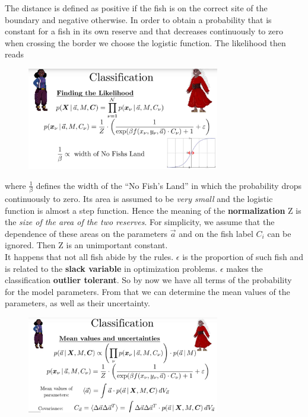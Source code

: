 \documentclass[12pt, a4paper]{scrartcl}
\begin{document}
The distance is defined as positive if the fish is on the correct site of the boundary and negative otherwise.
In order to obtain a probability that is constant for a fish in its own reserve and that decreases continuously to zero when crossing the border we choose the logistic function.
The likelihood then reads%
\begin{figure}[H]
	\centering
	\includegraphics[width=0.75\textwidth]{7_14.png}
\end{figure}
where $\frac {1}{\beta}$ defines the width of the ``No Fish’s Land'' in which the probability
drops continuously to zero. 
Its area is assumed to be \textit{very small} and the logistic function is almost a step function. 
Hence the meaning of the \textbf{normalization} Z is the \textit{size of the area of the two reserves}. For simplicity, we assume that the dependence of these areas on the parameters $\vec{a}$ and on the fish label $C_i$ can be ignored.
Then Z is an unimportant constant.\\
It happens that not all fish abide by the rules. $\epsilon$ is the proportion of such fish and is related to the \textbf{slack variable}
in optimization problems. 
$\epsilon$ makes the classification \textbf{outlier tolerant}.
So by now we have all terms of the probability for the model parameters.
From that we can determine the mean values of the parameters, as well as their uncertainty. %
\begin{figure}[H]
	\centering
	\includegraphics[width=0.75\textwidth]{7_15.png}
\end{figure}
\end{document}
